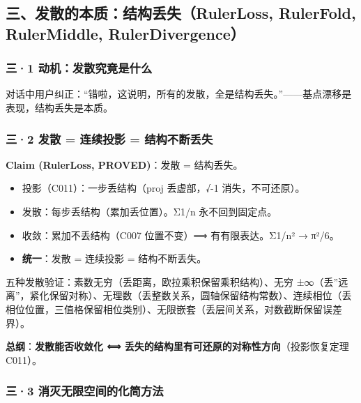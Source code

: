 \documentclass[
]{article}
\providecommand{\tightlist}{%
  \setlength{\itemsep}{0pt}\setlength{\parskip}{0pt}}
\begin{document}
\subsection{三、发散的本质：结构丢失（RulerLoss, RulerFold, RulerMiddle,
RulerDivergence）}\label{ux4e09ux53d1ux6563ux7684ux672cux8d28ux7ed3ux6784ux4e22ux5931rulerloss-rulerfold-rulermiddle-rulerdivergence}

\subsubsection{三·1
动机：发散究竟是什么}\label{ux4e091-ux52a8ux673aux53d1ux6563ux7a76ux7adfux662fux4ec0ux4e48}

对话中用户纠正：``错啦，这说明，所有的发散，全是结构丢失。''------基点漂移是表现，结构丢失是本质。

\subsubsection{三·2 发散 = 连续投影 =
结构不断丢失}\label{ux4e092-ux53d1ux6563-ux8fdeux7eedux6295ux5f71-ux7ed3ux6784ux4e0dux65adux4e22ux5931}

\textbf{Claim (RulerLoss, PROVED)}：发散 = 结构丢失。

\begin{itemize}
\tightlist
\item
  投影（C011）：一步丢结构（proj 丢虚部，√-1 消失，不可还原）。
\item
  发散：每步丢结构（累加丢位置）。Σ1/n 永不回到固定点。
\item
  收敛：累加不丢结构（C007 位置不变）⟹ 有有限表达。Σ1/n² → π²/6。
\item
  \textbf{统一}：发散 = 连续投影 = 结构不断丢失。
\end{itemize}

五种发散验证：素数无穷（丢距离，欧拉乘积保留乘积结构）、无穷
±∞（丢''远离''，紧化保留对称）、无理数（丢整数关系，圆轴保留结构常数）、连续相位（丢相位位置，三值格保留相位类别）、无限嵌套（丢层间关系，对数截断保留误差界）。

\textbf{总纲}：\textbf{发散能否收敛化 ⟺
丢失的结构里有可还原的对称性方向}（投影恢复定理 C011）。

\subsubsection{三·3
消灭无限空间的化简方法}\label{ux4e093-ux6d88ux706dux65e0ux9650ux7a7aux95f4ux7684ux5316ux7b80ux65b9ux6cd5}
\end{document}
